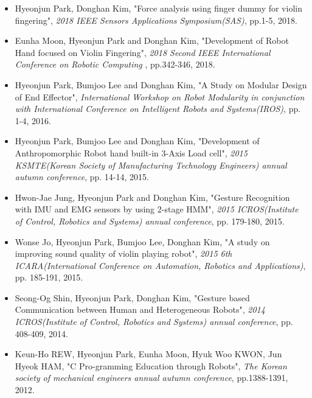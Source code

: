 \documentclass[a4paper,10pt]{article}
\begin{document}
{\begin{itemize}
    \item {\cvimportant Hyeonjun Park}, Donghan Kim, "Force analysis using finger dummy for violin fingering", {\em 2018 IEEE Sensors Applications Symposium(SAS)}, pp.1-5, 2018.
    \item Eunha Moon, {\cvimportant Hyeonjun Park} and Donghan Kim, "Development of Robot Hand focused on Violin Fingering", {\em 2018 Second IEEE International Conference on Robotic Computing} , pp.342-346, 2018.
    \item {\cvimportant Hyeonjun Park}, Bumjoo Lee and Donghan Kim, "A Study on Modular Design of End Effector", {\em International Workshop on Robot Modularity in conjunction with International Conference on Intelligent Robots and Systems(IROS)}, pp. 1-4, 2016.
    \item {\cvimportant Hyeonjun Park}, Bumjoo Lee and Donghan Kim, "Development of Anthropomorphic Robot hand built-in 3-Axis Load cell", {\em 2015 KSMTE(Korean Society of Manufacturing Technology Engineers) annual autumn conference}, pp. 14-14, 2015. 
    \item Hwon-Jae Jung, {\cvimportant Hyeonjun Park} and Donghan Kim, "Gesture Recognition with IMU and EMG sensors by using 2-stage HMM", {\em 2015 ICROS(Institute of Control, Robotics and Systems) annual conference}, pp. 179-180, 2015.
    \item Wonse Jo, {\cvimportant Hyeonjun Park}, Bumjoo Lee, Donghan Kim, "A study on improving sound quality of violin playing robot", {\em 2015 6th ICARA(International Conference on Automation, Robotics and Applications)}, pp. 185-191, 2015.
    \item Seong-Og Shin, {\cvimportant Hyeonjun Park}, Donghan Kim, "Gesture based Communication between Human and Heterogeneous Robots", {\em 2014 ICROS(Institute of Control, Robotics and Systems) annual conference}, pp. 408-409, 2014.
    \item Keun-Ho REW, {\cvimportant Hyeonjun Park}, Eunha Moon, Hyuk Woo KWON, Jun Hyeok HAM, "C Pro-gramming Education through Robots", {\em The Korean society of mechanical engineers annual autumn conference}, pp.1388-1391, 2012.

    \end{itemize}
}
\end{document}
